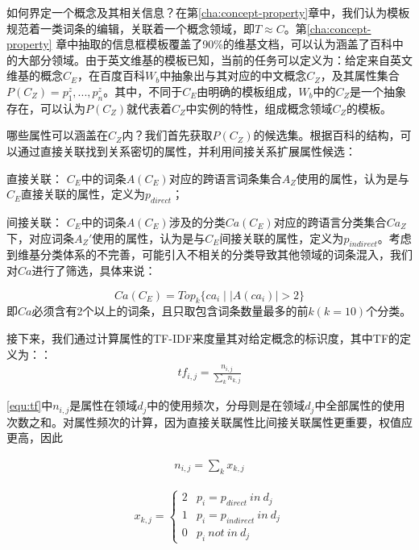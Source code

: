 如何界定一个概念及其相关信息？在第\ref{cha:concept-property}章中，我们认为模板规范着一类词条的编辑，关联着一个概念领域，即$T \approx C$。第\ref{cha:concept-property} 章中抽取的信息框模板覆盖了90\%的维基文档，可以认为涵盖了百科中的大部分领域。由于英文维基的模板已知，当前的任务可以定义为：给定来自英文维基的概念$C_E$，在百度百科$W_b$中抽象出与其对应的中文概念$C_Z$，及其属性集合$P(C_Z)={p_1^z,...,p_n^z}$。其中，不同于$C_E$由明确的模板组成，$W_b$中的$C_Z$是一个抽象存在，可以认为$P(C_Z)$就代表着$C_Z$中实例的特性，组成概念领域$C_Z$的模板。

哪些属性可以涵盖在$C_Z$内？我们首先获取$P(C_Z)$的候选集。根据百科的结构，可以通过直接关联找到关系密切的属性，并利用间接关系扩展属性候选：

{\heiti 直接关联：} $C_E$中的词条$A(C_E)$对应的跨语言词条集合$A_Z$使用的属性，认为是与$C_E$直接关联的属性，定义为$p_{direct}$；

{\heiti 间接关联：} $C_E$中的词条$A(C_E)$涉及的分类$Ca(C_E)$对应的跨语言分类集合$Ca_Z$下，对应词条$A_Z'$使用的属性，认为是与$C_E$间接关联的属性，定义为$p_{indirect}$。考虑到维基分类体系的不完善，可能引入不相关的分类导致其他领域的词条混入，我们对$Ca$进行了筛选，具体来说：

\begin{equation}
Ca(C_E) = Top_k\{ ca_i\mid |A(ca_i)| > 2 \}
\end{equation}
即$Ca$必须含有2个以上的词条，且只取包含词条数量最多的前$k(k=10)$个分类。

接下来，我们通过计算属性的TF-IDF来度量其对给定概念的标识度，其中TF的定义为：：
\begin{align}
\label{equ:tf}
tf_{i,j}=\frac{n_{i,j}}{\sum_{k}{n_{k,j}}}
\end{align}

\ref{equ:tf}中$n_{i,j}$是属性在领域$d_{j}$中的使用频次，分母则是在领域$d_{j}$中全部属性的使用次数之和。对属性频次的计算，因为直接关联属性比间接关联属性更重要，权值应更高，因此

\begin{align}
n_{i,j} = {\sum_{k}{x_{k,j}}}
\end{align}

\begin{align}
x_{k,j} =
\left\{\begin{matrix}
2 & p_i = p_{direct} \ in \ d_j\\
1 & p_i = p_{indirect} \ in \ d_j\\
0 & p_i \ not \ in \ d_j
\end{matrix}\right.
\end{align}

